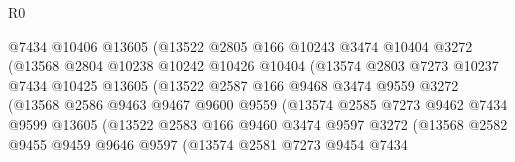 \begin{lexlean}{R0}
\begin{coremodule}
                            @7434
                            @10406
                            @13605
                            (@13522
                              @2805
                              @166
                              @10243
                              @3474
                              @10404
                              @3272
                              (@13568
                                @2804
                                @10238
                                @10242
                                @10426
                                @10404
                                (@13574
                                  @2803
                                  @7273
                                  @10237
                                  @7434
                                  @10425
                                  @13605
                                  (@13522
                                    @2587
                                    @166
                                    @9468
                                    @3474
                                    @9559
                                    @3272
                                    (@13568
                                      @2586
                                      @9463
                                      @9467
                                      @9600
                                      @9559
                                      (@13574
                                        @2585
                                        @7273
                                        @9462
                                        @7434
                                        @9599
                                        @13605
                                        (@13522
                                          @2583
                                          @166
                                          @9460
                                          @3474
                                          @9597
                                          @3272
                                          (@13568
                                            @2582
                                            @9455
                                            @9459
                                            @9646
                                            @9597
                                            (@13574
                                              @2581
                                              @7273
                                              @9454
                                              @7434

\end{coremodule}
\end{lexlean}
